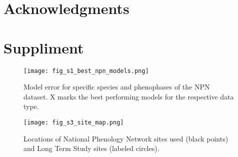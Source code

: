 \documentclass[fleqn,10pt,lineno]{wlpeerj} %
\begin{document}
\section*{Acknowledgments}




\setcounter{figure}{0}    
\section*{Suppliment}
\begin{figure}
	\centering
		\texttt{[image: fig\_s1\_best\_npn\_models.png]}
	\caption{Model error for specific species and phenophases of the NPN dataset. X marks the best performing models for the respective data type.}
\end{figure}

\begin{figure}
	\centering
		\texttt{[image: fig\_s3\_site\_map.png]}
	\caption{Locations of National Phenology Network sites used (black points) and Long Term Study sites (labeled circles).}
\end{figure}
\end{document}
